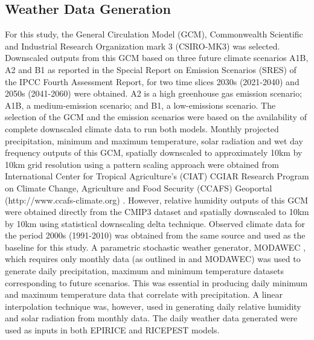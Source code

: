     \subsection{Weather Data Generation}
    \label{weather_data}
    For this study, the General Circulation Model (GCM), Commonwealth Scientific and Industrial Research Organization mark 3 (CSIRO-MK3) was selected. Downscaled outputs from this GCM based on three future climate scenarios A1B, A2 and B1 as reported in the Special Report on Emission Scenarios (SRES) of the IPCC Fourth Assessment Report, for two time slices 2030s (2021-2040) and 2050s (2041-2060) were obtained. A2 is a high greenhouse gas emission scenario; A1B, a medium-emission scenario; and B1, a low-emissions scenario. The selection of the GCM and the emission scenarios were based on the availability of complete downscaled climate data to run both models. Monthly projected precipitation, minimum and maximum temperature, solar radiation and wet day frequency outputs of this GCM, spatially downscaled to approximately 10km by 10km grid resolution using a pattern scaling approach were obtained from International Center for Tropical Agriculture's (CIAT) CGIAR Research Program on Climate Change, Agriculture and Food Security (CCAFS) Geoportal (http://www.ccafs-climate.org) \citep{Jones2009}. However, relative humidity outputs of this GCM were obtained directly from the CMIP3 dataset and spatially downscaled to 10km by 10km using statistical downscaling delta technique. Observed climate data for the period 2000s (1991-2010) was obtained from the same source and used as the baseline for this study. A parametric stochastic weather generator, MODAWEC \citep{Liu2009}, which requires only monthly data (as outlined in \citep{Geng1986} and MODAWEC) was used to generate daily precipitation, maximum and minimum temperature datasets corresponding to future scenarios. This was essential in producing daily minimum and maximum temperature data that correlate with precipitation. A linear interpolation technique was, however, used in generating daily relative humidity and solar radiation from monthly data. The daily weather data generated were used as inputs in both EPIRICE and RICEPEST models.
    
